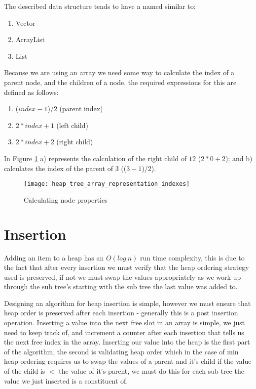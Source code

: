 The described data structure tends to have a named similar to:

\begin{enumerate}
\item Vector
\item ArrayList
\item List
\end{enumerate}

Because we are using an array we need some way to calculate the index of a parent node, and the children of a node, the required expressions for this are defined as follows:

\begin{enumerate}
\item ($index - 1$)/$2$ (parent index)
\item $2 * index + 1$ (left child)
\item $2 * index + 2$ (right child)
\end{enumerate}

In Figure \ref{fig:heap_tree_array_representation_indexes} a) represents the calculation of the right child of $12$ ($2 * 0 + 2$); and b) calculates the index of the parent of $3$ (($3 - 1$)/$2$).

\begin{figure}
\begin{center}
\texttt{[image: heap\_tree\_array\_representation\_indexes]}
\caption{Calculating node properties} \label{fig:heap_tree_array_representation_indexes}
\end{center}
\end{figure}

\section{Insertion}
Adding an item to a heap has an $O(log~n)$ run time complexity, this is due to the fact that after every insertion we must verify that the heap ordering strategy used is preserved, if not we must swap the values appropriately as we work up through the sub tree's starting with the sub tree the last value was added to.


Designing an algorithm for heap insertion is simple, however we must ensure that heap order is preserved after each insertion - generally this is a post insertion operation. Inserting a value into the next free slot in an array is simple, we just need to keep track of, and increment a counter after each insertion that tells us the next free index in the array. Inserting our value into the heap is the first part of the algorithm, the second is validating heap order which in the case of min heap ordering requires us to swap the values of a parent and it's child if the value of the child is $<$ the value of it's parent, we must do this for each sub tree the value we just inserted is a constituent of.

